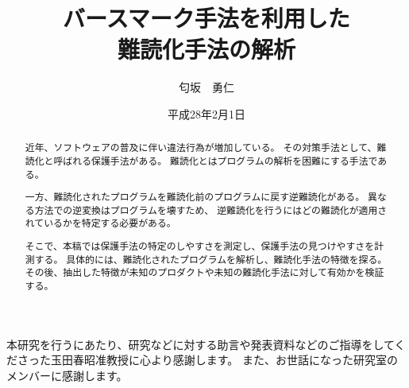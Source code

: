 \documentclass[12pt,twoside]{jbook}
\begin{document}
\title{
バースマーク手法を利用した\\
難読化手法の解析
}



\author{匂坂　勇仁}

\date{平成28年2月1日}





\maketitle


\begin{abstract}

近年、ソフトウェアの普及に伴い違法行為が増加している。
その対策手法として、難読化と呼ばれる保護手法がある。
難読化とはプログラムの解析を困難にする手法である。

一方、難読化されたプログラムを難読化前のプログラムに戻す逆難読化がある。
異なる方法での逆変換はプログラムを壊すため、
逆難読化を行うにはどの難読化が適用されているかを特定する必要がある。

そこで、本稿では保護手法の特定のしやすさを測定し、保護手法の見つけやすさを計測する。
具体的には、難読化されたプログラムを解析し、難読化手法の特徴を探る。
その後、抽出した特徴が未知のプロダクトや未知の難読化手法に対して有効かを検証する。

\end{abstract}

\begin{acknowledgments}

本研究を行うにあたり、研究などに対する助言や発表資料などのご指導をしてくださった玉田春昭准教授に心より感謝します。
また、お世話になった研究室のメンバーに感謝します。

\end{acknowledgments}

\tableofcontents       %

%
%
\end{document}

